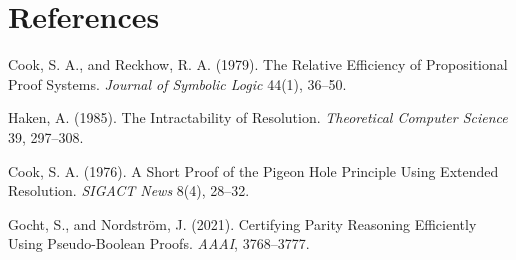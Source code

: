 \documentclass[11pt]{article}
\begin{document}
\section*{References}
Cook, S. A., and Reckhow, R. A. (1979).
The Relative Efficiency of Propositional Proof Systems.
\emph{Journal of Symbolic Logic} 44(1), 36--50.

Haken, A. (1985). The Intractability of Resolution.
\emph{Theoretical Computer Science} 39, 297--308.

Cook, S. A. (1976). A Short Proof of the Pigeon Hole
Principle Using Extended Resolution.
\emph{SIGACT News} 8(4), 28--32.

Gocht, S., and Nordstr\"om, J. (2021).
Certifying Parity Reasoning Efficiently Using Pseudo-Boolean Proofs.
\emph{AAAI}, 3768--3777.
\end{document}
